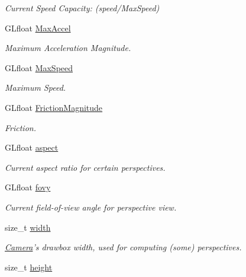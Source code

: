 \begin{DoxyCompactItemize}
\begin{DoxyCompactList}\small\item\em \-Current \-Speed \-Capacity\-: (speed/\-Max\-Speed) \end{DoxyCompactList}\item 
\hypertarget{class_camera_a7817b2e83ad8f783e2822ec7771c6fe9}{\-G\-Lfloat \hyperlink{class_camera_a7817b2e83ad8f783e2822ec7771c6fe9}{\-Max\-Accel}}\label{class_camera_a7817b2e83ad8f783e2822ec7771c6fe9}

\begin{DoxyCompactList}\small\item\em \-Maximum \-Acceleration \-Magnitude. \end{DoxyCompactList}\item 
\hypertarget{class_camera_a4e6866298a8e7a1ff2f529202892958e}{\-G\-Lfloat \hyperlink{class_camera_a4e6866298a8e7a1ff2f529202892958e}{\-Max\-Speed}}\label{class_camera_a4e6866298a8e7a1ff2f529202892958e}

\begin{DoxyCompactList}\small\item\em \-Maximum \-Speed. \end{DoxyCompactList}\item 
\-G\-Lfloat \hyperlink{class_camera_a4260507a4e59b2b079a0e1c6a5b64d5c}{\-Friction\-Magnitude}
\begin{DoxyCompactList}\small\item\em \-Friction. \end{DoxyCompactList}\item 
\-G\-Lfloat \hyperlink{class_camera_af3fdbc52ba0f7af7d8091986d6303119}{aspect}
\begin{DoxyCompactList}\small\item\em \-Current aspect ratio for certain perspectives. \end{DoxyCompactList}\item 
\-G\-Lfloat \hyperlink{class_camera_acc8b97facc57059530efad534c2f8314}{fovy}
\begin{DoxyCompactList}\small\item\em \-Current field-\/of-\/view angle for perspective view. \end{DoxyCompactList}\item 
\hypertarget{class_camera_ad49d7cc9d3e2f90332702cf67f1d5357}{size\-\_\-t \hyperlink{class_camera_ad49d7cc9d3e2f90332702cf67f1d5357}{width}}\label{class_camera_ad49d7cc9d3e2f90332702cf67f1d5357}

\begin{DoxyCompactList}\small\item\em \hyperlink{class_camera}{\-Camera}'s drawbox width, used for computing (some) perspectives. \end{DoxyCompactList}\item 
\hypertarget{class_camera_a99ad71730dc8fb068b814ca6328e40fa}{size\-\_\-t \hyperlink{class_camera_a99ad71730dc8fb068b814ca6328e40fa}{height}}\label{class_camera_a99ad71730dc8fb068b814ca6328e40fa}


\end{DoxyCompactItemize}
